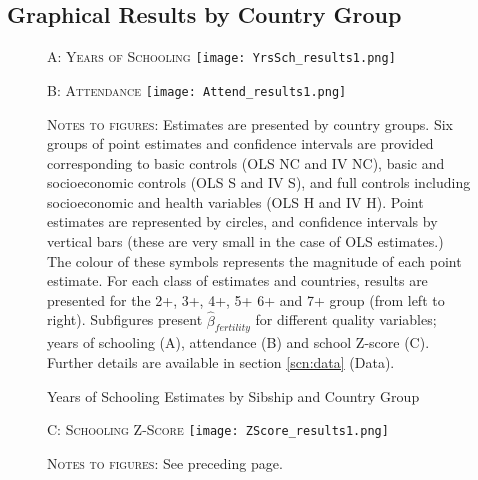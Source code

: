 \documentclass{article}[11pt,subeqn]
\begin{document}
\begin{spacing}{1.5}
\section{Graphical Results by Country Group}
\label{scn:Graphs}
\begin{figure}[!htbp]
\caption{Years of Schooling Estimates by Sibship and Country Group}
\label{fig:YrS}
\begin{center}
\vspace{-4mm}
\textsc{A: Years of Schooling}
\texttt{[image: YrsSch\_results1.png]}
\end{center}
\begin{center}
\vspace{4mm}
\textsc{B: Attendance}
\texttt{[image: Attend\_results1.png]}
\end{center}
\begin{footnotesize}\textsc{ Notes to figures:} Estimates are presented by country groups.  Six groups of point estimates and confidence intervals 
are provided corresponding to basic controls (OLS NC and IV NC), basic and socioeconomic controls (OLS S and IV S), and full controls including 
socioeconomic and health variables (OLS H and IV H).  Point estimates are represented by circles, and confidence intervals by vertical bars (these 
are very small in the case of OLS estimates.)  The colour of these symbols represents the magnitude of each point estimate.  For each class of 
estimates and countries, results are presented for the 2+, 3+, 4+, 5+ 6+ and 7+ group (from left to right).  Subfigures present $\hat{\beta}_{fertility}$ 
for different quality variables; years of schooling (A), attendance (B) and school Z-score (C).  Further details are available in section 
\ref{scn:data} (Data).  \end{footnotesize}
\end{figure}

\begin{figure}[!htbp]
\begin{center}
\vspace{4mm}
\textsc{C: Schooling Z-Score}
\texttt{[image: ZScore\_results1.png]}
\end{center}
\begin{footnotesize}\textsc{ Notes to figures:} See preceding page. \end{footnotesize}
\end{figure}

\let\clearpage\relax


\end{spacing}
\end{document}

